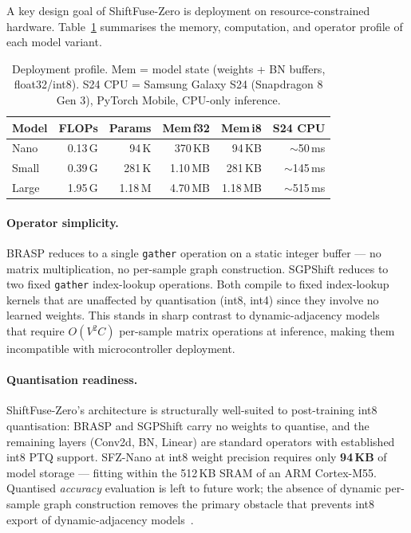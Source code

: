\documentclass[sigconf,screen,review,anonymous]{acmart}
\begin{document}
A key design goal of ShiftFuse-Zero is deployment on resource-constrained
hardware.
Table~\ref{tab:deploy} summarises the memory, computation, and operator
profile of each model variant.

\begin{table}[t]
\centering
\caption{Deployment profile. Mem = model state (weights + BN buffers,
  float32/int8). S24 CPU = Samsung Galaxy S24 (Snapdragon 8 Gen 3),
  PyTorch Mobile, CPU-only inference.}
\label{tab:deploy}
\setlength{\tabcolsep}{3pt}
\renewcommand{\arraystretch}{1.05}
\begin{tabular}{lrrrrr}
\toprule
Model & FLOPs & Params & Mem\,f32 & Mem\,i8 & S24 CPU \\
\midrule
Nano  & 0.13\,G & 94\,K  & 370\,KB & 94\,KB  & $\sim$50\,ms \\
Small & 0.39\,G & 281\,K & 1.10\,MB & 281\,KB & $\sim$145\,ms \\
Large & 1.95\,G & 1.18\,M & 4.70\,MB & 1.18\,MB & $\sim$515\,ms \\
\bottomrule
\end{tabular}
\vspace{-3mm}\end{table}

\paragraph{Operator simplicity.}
BRASP reduces to a single \texttt{gather} operation on a static integer
buffer --- no matrix multiplication, no per-sample graph construction.
SGPShift reduces to two fixed \texttt{gather} index-lookup operations.
Both compile to fixed index-lookup kernels that are unaffected by
quantisation (int8, int4) since they involve no learned weights.
This stands in sharp contrast to dynamic-adjacency
models~\cite{agcn,ctrgcn} that require $O(V^2C)$ per-sample matrix
operations at inference, making them incompatible with microcontroller
deployment.

\paragraph{Quantisation readiness.}
ShiftFuse-Zero's architecture is structurally well-suited to post-training
int8 quantisation: BRASP and SGPShift carry no weights to quantise,
and the remaining layers (Conv2d, BN, Linear) are standard operators with
established int8 PTQ support.
SFZ-Nano at int8 weight precision requires only \textbf{94\,KB} of model
storage --- fitting within the 512\,KB SRAM of an ARM Cortex-M55.
Quantised \emph{accuracy} evaluation is left to future work; the absence
of dynamic per-sample graph construction removes the primary obstacle
that prevents int8 export of dynamic-adjacency models~\cite{agcn,ctrgcn}.
\end{document}

